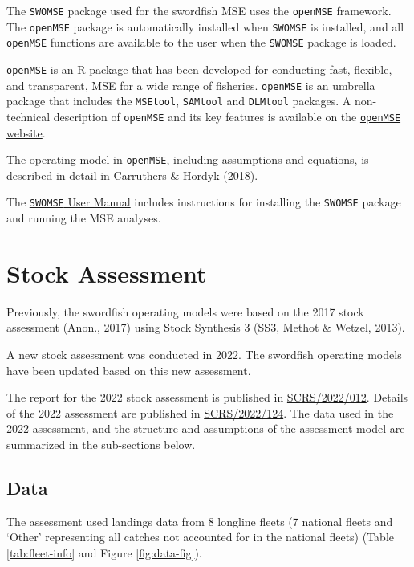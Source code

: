 \documentclass[
]{article}
\begin{document}
The \texttt{SWOMSE} package used for the swordfish MSE uses the \texttt{openMSE} framework. The \texttt{openMSE} package is automatically installed when \texttt{SWOMSE} is installed, and all \texttt{openMSE} functions are available to the user when the \texttt{SWOMSE} package is loaded.

\texttt{openMSE} is an R package that has been developed for conducting fast, flexible, and transparent, MSE for a wide range of fisheries. \texttt{openMSE} is an umbrella package that includes the \texttt{MSEtool}, \texttt{SAMtool} and \texttt{DLMtool} packages. A non-technical description of \texttt{openMSE} and its key features is available on the \href{https://openmse.com/}{\texttt{openMSE} website}.

The operating model in \texttt{openMSE}, including assumptions and equations, is described in detail in Carruthers \& Hordyk (2018).

The \href{../UserManual/User_Manual.html}{\texttt{SWOMSE} User Manual} includes instructions for installing the \texttt{SWOMSE} package and running the MSE analyses.

\hypertarget{stock-assessment}{%
\section{Stock Assessment}\label{stock-assessment}}

Previously, the swordfish operating models were based on the 2017 stock assessment (Anon., 2017) using Stock Synthesis 3 (SS3, Methot \& Wetzel, 2013).

A new stock assessment was conducted in 2022. The swordfish operating models have been updated based on this new assessment.

The report for the 2022 stock assessment is published in \href{https://www.iccat.int/Documents/CVSP/CV079_2022/n_2/CV079020392.pdf}{SCRS/2022/012}. Details of the 2022 assessment are published in \href{../SCRS_Papers/Schirripa_SCRS_2022_124.pdf}{SCRS/2022/124}. The data used in the 2022 assessment, and the structure and assumptions of the assessment model are summarized in the sub-sections below.

\hypertarget{data}{%
\subsection{Data}\label{data}}

The assessment used landings data from 8 longline fleets (7 national fleets and `Other' representing all catches not accounted for in the national fleets) (Table \ref{tab:fleet-info} and Figure \ref{fig:data-fig}).
\end{document}
